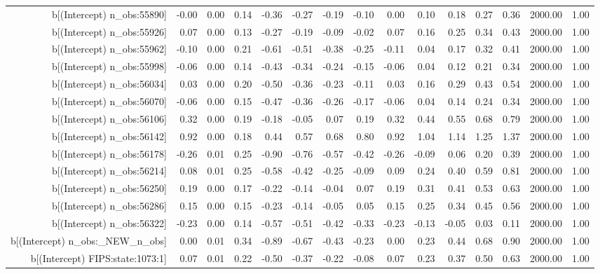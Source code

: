 \begin{table}[ht]
\begin{tabular}{rrrrrrrrrrrrrrr}
  b[(Intercept) n\_obs:55890] & -0.00 & 0.00 & 0.14 & -0.36 & -0.27 & -0.19 & -0.10 & 0.00 & 0.10 & 0.18 & 0.27 & 0.36 & 2000.00 & 1.00 \\ 
  b[(Intercept) n\_obs:55926] & 0.07 & 0.00 & 0.13 & -0.27 & -0.19 & -0.09 & -0.02 & 0.07 & 0.16 & 0.25 & 0.34 & 0.43 & 2000.00 & 1.00 \\ 
  b[(Intercept) n\_obs:55962] & -0.10 & 0.00 & 0.21 & -0.61 & -0.51 & -0.38 & -0.25 & -0.11 & 0.04 & 0.17 & 0.32 & 0.41 & 2000.00 & 1.00 \\ 
  b[(Intercept) n\_obs:55998] & -0.06 & 0.00 & 0.14 & -0.43 & -0.34 & -0.24 & -0.15 & -0.06 & 0.04 & 0.12 & 0.21 & 0.34 & 2000.00 & 1.00 \\ 
  b[(Intercept) n\_obs:56034] & 0.03 & 0.00 & 0.20 & -0.50 & -0.36 & -0.23 & -0.11 & 0.03 & 0.16 & 0.29 & 0.43 & 0.54 & 2000.00 & 1.00 \\ 
  b[(Intercept) n\_obs:56070] & -0.06 & 0.00 & 0.15 & -0.47 & -0.36 & -0.26 & -0.17 & -0.06 & 0.04 & 0.14 & 0.24 & 0.34 & 2000.00 & 1.00 \\ 
  b[(Intercept) n\_obs:56106] & 0.32 & 0.00 & 0.19 & -0.18 & -0.05 & 0.07 & 0.19 & 0.32 & 0.44 & 0.55 & 0.68 & 0.79 & 2000.00 & 1.00 \\ 
  b[(Intercept) n\_obs:56142] & 0.92 & 0.00 & 0.18 & 0.44 & 0.57 & 0.68 & 0.80 & 0.92 & 1.04 & 1.14 & 1.25 & 1.37 & 2000.00 & 1.00 \\ 
  b[(Intercept) n\_obs:56178] & -0.26 & 0.01 & 0.25 & -0.90 & -0.76 & -0.57 & -0.42 & -0.26 & -0.09 & 0.06 & 0.20 & 0.39 & 2000.00 & 1.00 \\ 
  b[(Intercept) n\_obs:56214] & 0.08 & 0.01 & 0.25 & -0.58 & -0.42 & -0.25 & -0.09 & 0.09 & 0.24 & 0.40 & 0.59 & 0.81 & 2000.00 & 1.00 \\ 
  b[(Intercept) n\_obs:56250] & 0.19 & 0.00 & 0.17 & -0.22 & -0.14 & -0.04 & 0.07 & 0.19 & 0.31 & 0.41 & 0.53 & 0.63 & 2000.00 & 1.00 \\ 
  b[(Intercept) n\_obs:56286] & 0.15 & 0.00 & 0.15 & -0.23 & -0.14 & -0.05 & 0.05 & 0.15 & 0.25 & 0.34 & 0.45 & 0.56 & 2000.00 & 1.00 \\ 
  b[(Intercept) n\_obs:56322] & -0.23 & 0.00 & 0.14 & -0.57 & -0.51 & -0.42 & -0.33 & -0.23 & -0.13 & -0.05 & 0.03 & 0.11 & 2000.00 & 1.00 \\ 
  b[(Intercept) n\_obs:\_NEW\_n\_obs] & 0.00 & 0.01 & 0.34 & -0.89 & -0.67 & -0.43 & -0.23 & 0.00 & 0.23 & 0.44 & 0.68 & 0.90 & 2000.00 & 1.00 \\ 
  b[(Intercept) FIPS:state:1073:1] & 0.07 & 0.01 & 0.22 & -0.50 & -0.37 & -0.22 & -0.08 & 0.07 & 0.23 & 0.37 & 0.50 & 0.63 & 2000.00 & 1.00 \\ 

\end{tabular}
\end{table}
